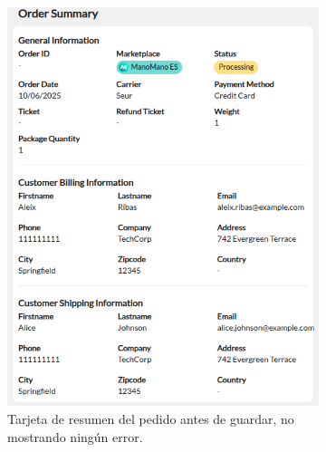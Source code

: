 \begin{figure}[H]
    \centering
    \begin{subfigure}{0.45\linewidth}
        \centering
        \includegraphics[width=\linewidth]{figures/design_develop/screenshots/tarjeta_resumen_antes_guardar.png}
        \caption{Tarjeta de resumen del pedido antes de guardar, no mostrando ningún error.}
    \end{subfigure}
    \hfill
    \begin{subfigure}{0.45\linewidth}
        \centering

\end{subfigure}
\end{figure}
